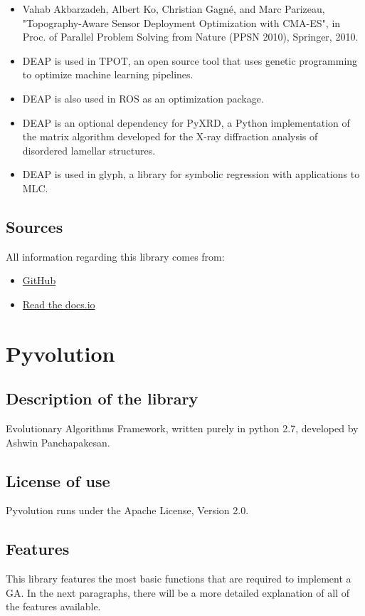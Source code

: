 \documentclass{article}
\begin{document}
\begin{itemize}
   \item  Vahab Akbarzadeh, Albert Ko, Christian Gagné, and Marc Parizeau, "Topography-Aware Sensor Deployment Optimization with CMA-ES", in Proc. of Parallel Problem Solving from Nature (PPSN 2010), Springer, 2010.
 \item   DEAP is used in TPOT, an open source tool that uses genetic programming to optimize machine learning pipelines.
  \item   DEAP is also used in ROS as an optimization package.
\item     DEAP is an optional dependency for PyXRD, a Python implementation of the matrix algorithm developed for the X-ray diffraction analysis of disordered lamellar structures.
   \item  DEAP is used in glyph, a library for symbolic regression with applications to MLC.
    
\end{itemize}
\subsection{Sources}
 All information regarding this library comes from:
 \begin{itemize}
     \item \href{https://github.com/deap/deap}{GitHub}
     \item \href{https://deap.readthedocs.io/en/master/}{Read the docs.io}
 \end{itemize}
 
\section{Pyvolution}

\subsection{Description of the library}
Evolutionary Algorithms Framework, written purely in python 2.7, developed by Ashwin Panchapakesan.
\subsection{License of use}
Pyvolution runs under the Apache License, Version 2.0.
\subsection{Features}
This library features the most basic functions that are required to implement a GA. In the next paragraphs, there will be a more detailed explanation of all of the features available. 
\end{document}
